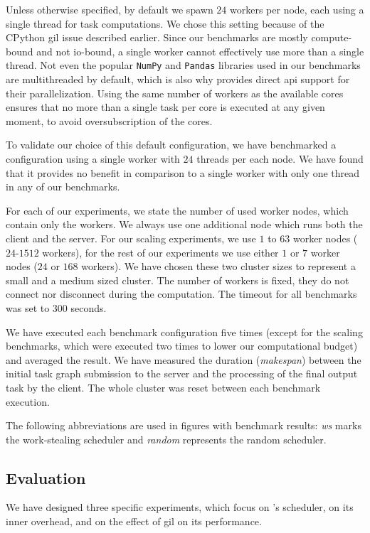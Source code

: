 Unless otherwise specified, by default we spawn $24$
\dask{} workers per node, each using a single thread for task computations. We
chose this setting because of the CPython \gls{gil} issue described earlier.
Since our benchmarks are mostly compute-bound and not \gls{io}-bound, a single
worker cannot effectively use more than a single thread. Not even the popular
\texttt{NumPy} and \texttt{Pandas} libraries used in our benchmarks are
multithreaded by default, which is also why \dask{} provides direct
\gls{api} support for their parallelization. Using the same number of workers as
the available cores ensures that no more than a single task per core is executed at any given
moment, to avoid oversubscription of the cores.

To validate our choice of this default configuration, we have benchmarked a configuration using a
single worker with $24$ threads per each node. We have found that it provides
no benefit in comparison to a single worker with only one thread in any of our benchmarks.

For each of our experiments, we state the number of used worker nodes, which contain only the
workers. We always use one additional node which runs both the client and the server. For our
scaling experiments, we use $1$ to $63$ worker nodes
($24$-$1512$ \dask{} workers), for
the rest of our experiments we use either $1$ or $7$
worker nodes ($24$ or $168$ \dask{}
workers). We have chosen these two cluster sizes to represent a small and a medium sized
\dask{} cluster. The number of workers is fixed, they do not connect nor
disconnect during the computation. The timeout for all benchmarks was set to
$300$ seconds.

We have executed each benchmark configuration five times (except for the scaling benchmarks, which
were executed two times to lower our computational budget) and averaged the result. We have
measured the duration (\emph{makespan}) between the initial task graph submission to
the server and the processing of the final output task by the client. The whole cluster was reset
between each benchmark execution.

The following abbreviations are used in figures with benchmark results: \emph{ws}
marks the work-stealing scheduler and \emph{random} represents the random scheduler.

\subsection*{Evaluation}
We have designed three specific experiments, which focus on \dask{}'s
scheduler, on its inner overhead, and on the effect of \gls{gil} on its
performance.


